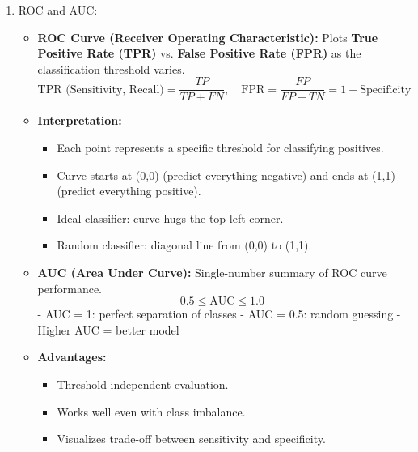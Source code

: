 \documentclass{article}
\begin{document}
\begin{enumerate}
\bigskip

\noindent\textbf{Computed Metrics:}
\begin{align*}
\text{Accuracy} &= \frac{40 + 30}{100} = 0.70 \\
\text{Error Rate} &= 1 - 0.70 = 0.30 \\
\text{Sensitivity (Recall, TPR)} &= \frac{40}{40 + 10} = 0.80 \\
\text{Specificity (TNR)} &= \frac{30}{30 + 20} = 0.60 \\
\text{Precision} &= \frac{40}{40 + 20} = 0.67 \\
\text{F1 Score} &= 2 \cdot \frac{0.67 \cdot 0.80}{0.67 + 0.80} \approx 0.73
\end{align*}

\item ROC and AUC:

\begin{itemize}
    \item \textbf{ROC Curve (Receiver Operating Characteristic):}  
    Plots \textbf{True Positive Rate (TPR)} vs. \textbf{False Positive Rate (FPR)} as the classification threshold varies.
    \[
    \text{TPR (Sensitivity, Recall)} = \frac{TP}{TP + FN}, \quad
    \text{FPR} = \frac{FP}{FP + TN} = 1 - \text{Specificity}
    \]

    \item \textbf{Interpretation:}
    \begin{itemize}
        \item Each point represents a specific threshold for classifying positives.
        \item Curve starts at (0,0) (predict everything negative) and ends at (1,1) (predict everything positive).
        \item Ideal classifier: curve hugs the top-left corner.
        \item Random classifier: diagonal line from (0,0) to (1,1).
    \end{itemize}

    \item \textbf{AUC (Area Under Curve):}  
    Single-number summary of ROC curve performance.
    \[
    0.5 \leq \text{AUC} \leq 1.0
    \]
    - AUC = 1: perfect separation of classes  
    - AUC = 0.5: random guessing  
    - Higher AUC = better model

    \item \textbf{Advantages:}  
    \begin{itemize}
        \item Threshold-independent evaluation.  
        \item Works well even with class imbalance.  
        \item Visualizes trade-off between sensitivity and specificity.
    \end{itemize}
\end{itemize}


\end{enumerate}
\end{document}
